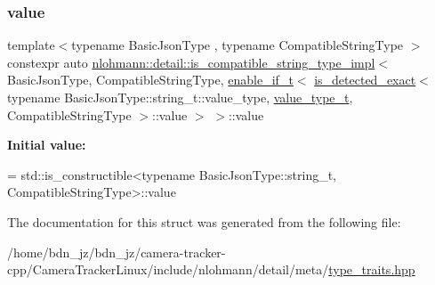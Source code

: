 \subsubsection{\texorpdfstring{value}{value}}
{\footnotesize\ttfamily template$<$typename Basic\+Json\+Type , typename Compatible\+String\+Type $>$ \\
constexpr auto \hyperlink{structnlohmann_1_1detail_1_1is__compatible__string__type__impl}{nlohmann\+::detail\+::is\+\_\+compatible\+\_\+string\+\_\+type\+\_\+impl}$<$ Basic\+Json\+Type, Compatible\+String\+Type, \hyperlink{namespacenlohmann_1_1detail_a02bcbc878bee413f25b985ada771aa9c}{enable\+\_\+if\+\_\+t}$<$ \hyperlink{namespacenlohmann_1_1detail_a7542b4dbac07817fd4849ecfa4619def}{is\+\_\+detected\+\_\+exact}$<$ typename Basic\+Json\+Type\+::string\+\_\+t\+::value\+\_\+type, \hyperlink{namespacenlohmann_1_1detail_af91beae90c2fb0f931079b3d50a343bc}{value\+\_\+type\+\_\+t}, Compatible\+String\+Type $>$\+::value $>$ $>$\+::value\hspace{0.3cm}{\ttfamily [static]}}

{\bfseries Initial value\+:}
\begin{DoxyCode}
=
        std::is\_constructible<typename BasicJsonType::string\_t, CompatibleStringType>::value
\end{DoxyCode}


The documentation for this struct was generated from the following file\+:\begin{DoxyCompactItemize}
\item 
/home/bdn\+\_\+jz/bdn\+\_\+jz/camera-\/tracker-\/cpp/\+Camera\+Tracker\+Linux/include/nlohmann/detail/meta/\hyperlink{type__traits_8hpp}{type\+\_\+traits.\+hpp}\end{DoxyCompactItemize}
